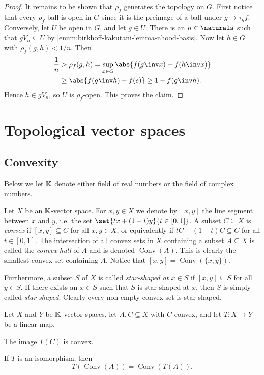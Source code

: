\documentclass[article, a4paper, 11pt, oneside]{memoir}
\numberwithin{equation}{chapter}
\begin{document}
\begin{proof}
    It remains to be shown that $\rho_f$ generates the topology on $G$. First notice that every $\rho_f$-ball is open in $G$ since it is the preimage of a ball under $g \mapsto \tau_g f$. Conversely, let $U$ be open in $G$, and let $g \in U$. There is an $n \in \naturals$ such that $g V_n \subseteq U$ by \cref{enum:birkhoff-kakutani-lemma-nhood-basis}. Now let $h \in G$ with $\rho_f(g,h) < 1/n$. Then
    \begin{align*}
        \frac{1}{n}
            &> \rho_f(g,h)
             = \sup_{x \in G} \abs{f(g\inv x) - f(h\inv x)} \\
            &\geq \abs{f(g\inv h) - f(e)}
             \geq 1 - f(g\inv h).
    \end{align*}
    Hence $h \in gV_n$, so $U$ is $\rho_f$-open. This proves the claim.
\end{proof}


\chapter{Topological vector spaces}

\section{Convexity}

\newcommand{\conv}{\operatorname{Conv}}

Below we let $\mathbb{K}$ denote either field of real numbers or the field of complex numbers.

Let $X$ be an $\mathbb{K}$-vector space. For $x,y \in X$ we denote by $[x,y]$ the line segment between $x$ and $y$, i.e. the set $\set{tx + (1-t)y}{t \in [0,1]}$. A subset $C \subseteq X$ is \emph{convex} if $[x,y] \subseteq C$ for all $x,y \in X$, or equivalently if $tC + (1-t)C \subseteq C$ for all $t \in [0,1]$. The intersection of all convex sets in $X$ containing a subset $A \subseteq X$ is called the \emph{convex hull} of $A$ and is denoted $\conv(A)$. This is clearly the smallest convex set containing $A$. Notice that $[x,y] = \conv(\{x,y\})$.

Furthermore, a subset $S$ of $X$ is called \emph{star-shaped at $x \in S$} if $[x,y] \subseteq S$ for all $y \in S$. If there exists an $x \in S$ such that $S$ is star-shaped at $x$, then $S$ is simply called \emph{star-shaped}. Clearly every non-empty convex set is star-shaped.

\begin{lemma}
    Let $X$ and $Y$ be $\mathbb{K}$-vector spaces, let $A, C \subseteq X$ with $C$ convex, and let $T \colon X \to Y$ be a linear map.
    \begin{enumlem}
        \item The image $T(C)$ is convex.
        \item \label{enum:convex-hull-isomorphism} If $T$ is an isomorphism, then
        \begin{equation*}
            T(\conv(A)) = \conv(T(A)).
        \end{equation*}
    \end{enumlem}
\end{lemma}
\end{document}

